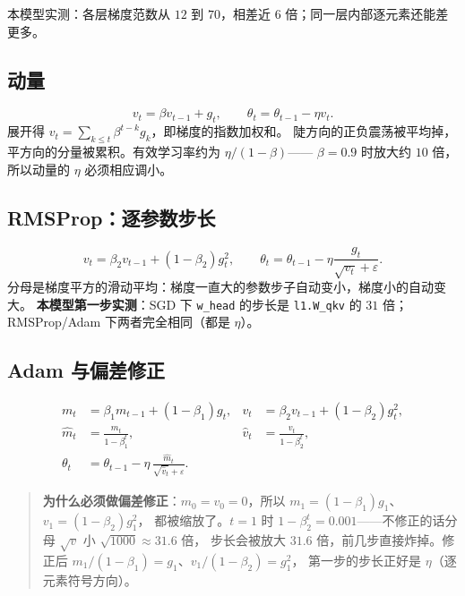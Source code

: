 \documentclass[11pt,a4paper]{ctexart}
\begin{document}
本模型实测：各层梯度范数从 $12$ 到 $70$，相差近 $6$ 倍；同一层内部逐元素还能差更多。

\subsection{动量}

\begin{equation}
  v_t=\beta v_{t-1}+g_t,\qquad \theta_t=\theta_{t-1}-\eta v_t .
\end{equation}
展开得 $v_t=\sum_{k\le t}\beta^{t-k}g_k$，即梯度的指数加权和。
陡方向的正负震荡被平均掉，平方向的分量被累积。有效学习率约为 $\eta/(1-\beta)$——
$\beta=0.9$ 时放大约 $10$ 倍，所以动量的 $\eta$ 必须相应调小。

\subsection{RMSProp：逐参数步长}

\begin{equation}
  v_t=\beta_2v_{t-1}+(1-\beta_2)g_t^2,\qquad
  \theta_t=\theta_{t-1}-\eta\frac{g_t}{\sqrt{v_t}+\varepsilon} .
\end{equation}
分母是梯度平方的滑动平均：梯度一直大的参数步子自动变小，梯度小的自动变大。
\textbf{本模型第一步实测}：SGD 下 \texttt{w\_head} 的步长是 \texttt{l1.W\_qkv} 的
$31$ 倍；RMSProp/Adam 下两者完全相同（都是 $\eta$）。

\subsection{Adam 与偏差修正}

\begin{align}
  m_t&=\beta_1m_{t-1}+(1-\beta_1)g_t, &
  v_t&=\beta_2v_{t-1}+(1-\beta_2)g_t^2,\\
  \hat m_t&=\frac{m_t}{1-\beta_1^t}, &
  \hat v_t&=\frac{v_t}{1-\beta_2^t},\\
  \theta_t&=\theta_{t-1}-\eta\,\frac{\hat m_t}{\sqrt{\hat v_t}+\varepsilon}. &&
\end{align}

\begin{quote}
\textbf{为什么必须做偏差修正}：$m_0=v_0=0$，所以 $m_1=(1-\beta_1)g_1$、$v_1=(1-\beta_2)g_1^2$，
都被缩放了。$t=1$ 时 $1-\beta_2^t=0.001$——不修正的话分母 $\sqrt{v}$ 小 $\sqrt{1000}\approx31.6$ 倍，
步长会被放大 $31.6$ 倍，前几步直接炸掉。修正后 $m_1/(1-\beta_1)=g_1$、$v_1/(1-\beta_2)=g_1^2$，
第一步的步长正好是 $\eta$（逐元素符号方向）。
\end{quote}
\end{document}

